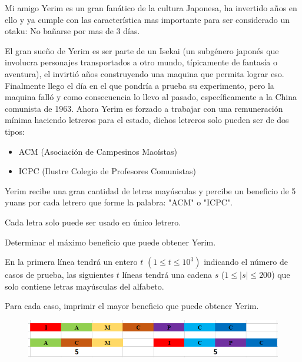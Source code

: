 
Mi amigo Yerim es un gran fanático de la cultura Japonesa, ha invertido años en ello y ya cumple con las característica mas importante para ser considerado un otaku: No bañarse por mas de 3 días.

El gran sueño de Yerim es ser parte de un Isekai (un subgénero japonés que involucra personajes transportados a otro mundo, típicamente de fantasía o aventura), el invirtió años construyendo una maquina que permita lograr eso.
Finalmente llego el día en el que pondría a prueba su experimento, pero la maquina falló y como consecuencia lo llevo al pasado, específicamente a la China comunista de 1963.
Ahora Yerim es forzado a trabajar con una remuneración mínima haciendo letreros para el estado, dichos letreros solo pueden ser de dos tipos:
\begin{itemize}
	\item ACM (Asociación de Campesinos Maoístas)
	\item ICPC (Ilustre Colegio de Profesores Comunistas)
\end{itemize}

Yerim recibe una gran cantidad de letras mayúsculas y percibe un beneficio de 5 yuans por cada letrero que forme la palabra: "ACM" o "ICPC".

Cada letra solo puede ser usado en único letrero.


Determinar el máximo beneficio que puede obtener Yerim.


En la primera línea tendrá un entero $t$ $(1 \leq t \leq10^3)$ indicando el número de casos de prueba, las siguientes $t$ líneas tendrá una cadena $s$ ($1\leq |s|\leq200$) que solo contiene letras mayúsculas del alfabeto.

\outputText

Para cada caso, imprimir el mayor beneficio que puede obtener Yerim.\\

\exampleCases

\begin{example}
\end{example}

\explanationText

\begin{figure}[H]
\centering
  \includegraphics[width=15cm]{2023/M_DiosSiCastigaDosVeces/images/Screenshot_4.png}
\end{figure}